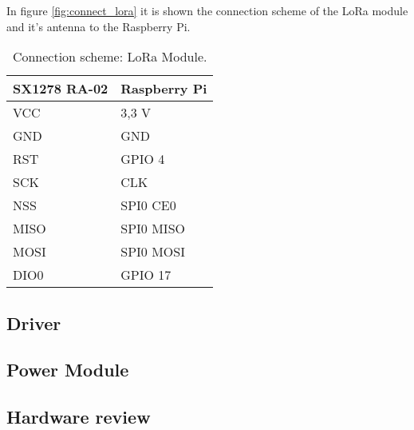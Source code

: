 In figure \ref{fig:connect_lora} it is shown the connection scheme of the LoRa module and it's antenna to the Raspberry Pi.

\begin{table}[H]
	\centering
	\begin{tabular}{|m{5cm}|m{6cm}|}
		\hline
		\textbf{SX1278 RA-02} & \textbf{Raspberry Pi}
		\\\hline\hline
		
		VCC & 3,3 V
		\\\hline
		GND & GND
		\\\hline
		RST & GPIO 4
		\\\hline
		SCK & CLK
		\\\hline
		NSS & SPI0 CE0
		\\\hline
		MISO & SPI0 MISO
		\\\hline
		MOSI & SPI0 MOSI
		\\\hline
		DIO0 & GPIO 17
		\\\hline
	\end{tabular}
	
	\caption{Connection scheme: LoRa Module.}
	\label{table:connect_lora}
\end{table}



\subsection{Driver}

\subsection{Power Module}


%
%		
%
%	

\subsection{Hardware review} %

